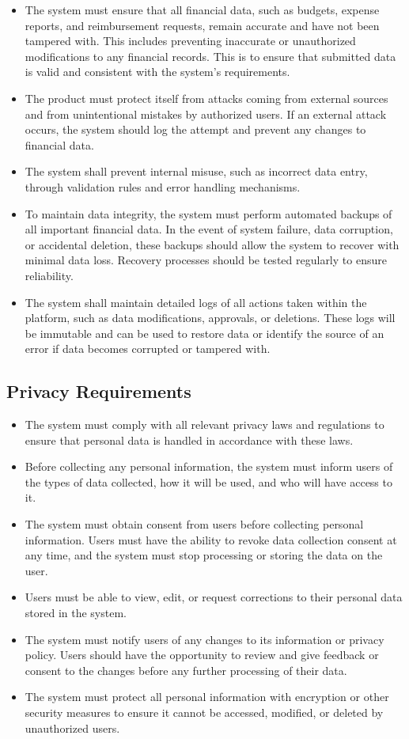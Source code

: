 \documentclass[12pt]{article}
\begin{document}
\begin{itemize}
    \item The system must ensure that all financial data, such as budgets, expense reports, and reimbursement requests, remain accurate and have not been tampered with. This includes preventing inaccurate or unauthorized modifications to any financial records. This is to ensure that submitted data is valid and consistent with the system's requirements.
    \item The product must protect itself from attacks coming from external sources and from unintentional mistakes by authorized users. If an external attack occurs, the system should log the attempt and prevent any changes to financial data.
    \item The system shall prevent internal misuse, such as incorrect data entry, through validation rules and error handling mechanisms.
    \item To maintain data integrity, the system must perform automated backups of all important financial data. In the event of system failure, data corruption, or accidental deletion, these backups should allow the system to recover with minimal data loss. Recovery processes should be tested regularly to ensure reliability.
    \item The system shall maintain detailed logs of all actions taken within the platform, such as data modifications, approvals, or deletions. These logs will be immutable and can be used to restore data or identify the source of an error if data becomes corrupted or tampered with.
\end{itemize}

\subsection{Privacy Requirements}

\begin{itemize}
  \item The system must comply with all relevant privacy laws and regulations to ensure that personal data is handled in accordance with these laws.
  \item Before collecting any personal information, the system must inform users of the types of data collected, how it will be used, and who will have access to it.
  \item The system must obtain consent from users before collecting personal information. Users must have the ability to revoke data collection consent at any time, and the system must stop processing or storing the data on the user.
  \item Users must be able to view, edit, or request corrections to their personal data stored in the system.
  \item The system must notify users of any changes to its information or privacy policy. Users should have the opportunity to review and give feedback or consent to the changes before any further processing of their data.
  \item The system must protect all personal information with encryption or other security measures to ensure it cannot be accessed, modified, or deleted by unauthorized users. 
\end{itemize}
\end{document}
